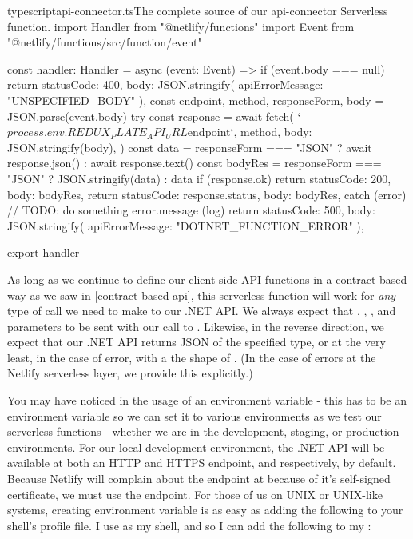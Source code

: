 \documentclass[a4paper,headinclude=on,footinclude=on,12pt,oneside]{scrbook}
\begin{document}
\begin{codeInput}{typescript}{api-connector.ts}{The complete source of our api-connector Serverless function.}
import { Handler } from "@netlify/functions"
import { Event } from "@netlify/functions/src/function/event"

const handler: Handler = async (event: Event) => {
  if (event.body === null) {
    return {
      statusCode: 400,
      body: JSON.stringify({ apiErrorMessage: "UNSPECIFIED_BODY" }),
    }
  }
  const { endpoint, method, responseForm, body } = JSON.parse(event.body)
  try {
    const response = await fetch(
      `${process.env.REDUX_PLATE_API_URL}${endpoint}`,
      {
        method,
        body: JSON.stringify(body),
      }
    )
    const data =
      responseForm === "JSON" ? await response.json() : await response.text()
    const bodyRes = responseForm === "JSON" ? JSON.stringify(data) : data
    if (response.ok) {
      return {
        statusCode: 200,
        body: bodyRes,
      }
    }
    return {
      statusCode: response.status,
      body: bodyRes,
    }
  } catch (error) {
    // TODO: do something error.message (log)
    return {
      statusCode: 500,
      body: JSON.stringify({ apiErrorMessage: "DOTNET_FUNCTION_ERROR" }),
    }
  }
}

export { handler }  
\end{codeInput}

As long as we continue to define our client-side API functions in a contract based way as we saw in \ref{contract-based-api}, this  serverless function will work for \textit{any} type of call we need to make to our .NET API. We always expect that , , , and  parameters to be sent with our call to . Likewise, in the reverse direction, we expect that our .NET API returns JSON of the specified type, or at the very least, in the case of error, with a the shape of . (In the case of errors at the Netlify serverless layer, we provide this  explicitly.)


You may have noticed in  the usage of an environment variable  - this has to be an environment variable so we can set it to various environments as we test our serverless functions - whether we are in the development, staging, or production environments. For our local development environment, the .NET API will be available at both an HTTP and HTTPS endpoint,  and  respectively, by default. Because Netlify will complain about the endpoint at  because of it's self-signed certificate, we must use the  endpoint. For those of us on UNIX or UNIX-like systems, creating environment variable  is as easy as adding the following to your shell's profile file. I use  as my shell, and so I can add the following to my :
\end{document}

